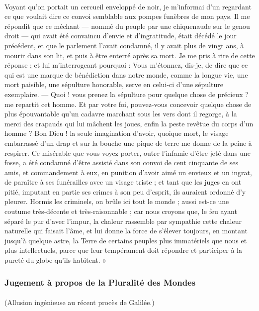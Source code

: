 \documentclass[a4paper, 11pt, oneside, landscape]{article}
\begin{document}
\paragraph{}
Voyant qu'on portait un cercueil enveloppé de noir, je m'informai d'un regardant ce que voulait dire ce convoi semblable aux pompes funèbres de mon pays. Il me répondit que ce méchant --- nommé du peuple par une chiquenaude sur le genou droit --- qui avait été convaincu d'envie et d'ingratitude, était décédé le jour précédent, et que le parlement l'avait condamné, il y avait plus de vingt ans, à mourir dans son lit, et puis à être enterré après sa mort. Je me pris à rire de cette réponse ; et lui m'interrogeant pourquoi : Vous m'étonnez, dis-je, de dire que ce qui est une marque de bénédiction dans notre monde, comme la longue vie, une mort paisible, une sépulture honorable, serve en celui-ci d'une sépulture exemplaire. --- Quoi ! vous prenez la sépulture pour quelque chose de précieux ? me repartit cet homme. Et par votre foi, pouvez-vous concevoir quelque chose de plus épouvantable qu'un cadavre marchant sous les vers dont il regorge, à la merci des crapauds qui lui mâchent les joues, enfin la peste revêtue du corps d'un homme ? Bon Dieu ! la seule imagination d'avoir, quoique mort, le visage embarrassé d'un drap et sur la bouche une pique de terre me donne de la peine à respirer. Ce misérable que vous voyez porter, outre l'infamie d'être jeté dans une fosse, a été condamné d'être assisté dans son convoi de cent cinquante de ses amis, et commandement à eux, en punition d'avoir aimé un envieux et un ingrat, de paraître à ses funérailles avec un visage triste ; et tant que les juges en ont pitié, imputant en partie ses crimes à son peu d'esprit, ils auraient ordonné d'y pleurer. Hormis les criminels, on brûle ici tout le monde ; aussi est-ce une coutume très-décente et très-raisonnable ; car nous croyons que, le feu ayant séparé le pur d'avec l'impur, la chaleur rassemble par sympathie cette chaleur naturelle qui faisait l'âme, et lui donne la force de s'élever toujours, en montant jusqu'à quelque astre, la Terre de certains peuples plus immatériels que nous et plus intellectuels, parce que leur tempérament doit répondre et participer à la pureté du globe qu'ils habitent. »

\subsubsection{Jugement à propos de la Pluralité des Mondes}
\paragraph{}
(Allusion ingénieuse au récent procès de Galilée.)
\end{document}
